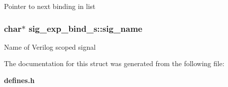 Pointer to next binding in list 
\subsubsection{\setlength{\rightskip}{0pt plus 5cm}char$\ast$ {\bf sig\_\-exp\_\-bind\_\-s::sig\_\-name}}\label{structsig__exp__bind__s_o0}


Name of Verilog scoped signal 

The documentation for this struct was generated from the following file:\begin{CompactItemize}
\item 
{\bf defines.h}\end{CompactItemize}
